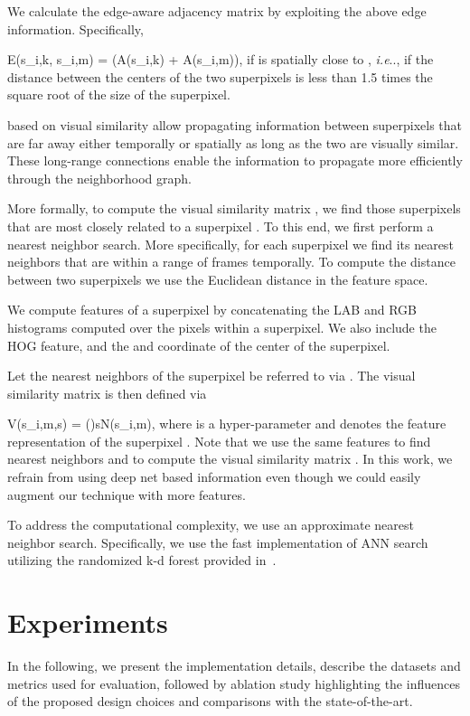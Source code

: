 \documentclass[runningheads]{llncs}
\makeatletter
\newcommand\para[1]{\noindent{#1}}
\def\be {}
\def\@onedot{\ifx\@let@token.\else.\null\fi\xspace}
\DeclareRobustCommand\onedot{\futurelet\@let@token\@onedot}
\def\ie{\emph{i.e}\onedot} \def\Ie{\emph{I.e}\onedot}
\makeatother
\begin{document}
We calculate the edge-aware adjacency matrix  by exploiting the above edge information. Specifically, 
\be
E(s_{i,k}, s_{i,m}) =  \left(A(s_{i,k}) + A(s_{i,m})\right),
\ee
if  is spatially close to , \ie, if the distance between the centers of the two superpixels is less than 1.5 times the square root of the size of the superpixel.

\para{\bf Long range connections} based on visual similarity allow propagating information between superpixels that are far away either temporally or spatially as long as the two are visually similar. These long-range connections enable the information to propagate more efficiently through the neighborhood graph.

More formally,
to compute the visual similarity matrix , we find those superpixels that are most closely related to a superpixel . To this end, we first perform a  nearest neighbor search. More specifically, for each superpixel  we find its  nearest neighbors that are within a range of  frames temporally. To compute the distance between two superpixels we use the Euclidean distance in the feature space. 

We compute features  of a superpixel  by concatenating the LAB and RGB histograms computed over the pixels within a superpixel. We also include the HOG feature, and the  and  coordinate of the center of the superpixel.

Let the  nearest neighbors of the superpixel  be referred to via .
The visual similarity matrix is then defined via
\be
\small
V(s_{i,m},s) = \exp\left(\right)\quad\forall s\in N(s_{i,m}),
\label{eq:NonlocalConnection}
\ee
where  is a hyper-parameter and  denotes the feature representation of the superpixel . Note that we use the same features to find  nearest neighbors and to compute the visual similarity matrix . In this work, we refrain from using deep net based information even though we could easily augment our technique with more features.


To address the computational complexity, we use an approximate  nearest neighbor search. Specifically, we use the fast implementation of ANN search utilizing the randomized k-d forest provided in~\cite{MujaFLANN09}.
 

\section{Experiments}
\label{sec:exp}


In the following, we present the implementation details, describe the datasets and metrics used for evaluation, followed by ablation study highlighting the influences of the proposed design choices and comparisons with the state-of-the-art.
\end{document}
